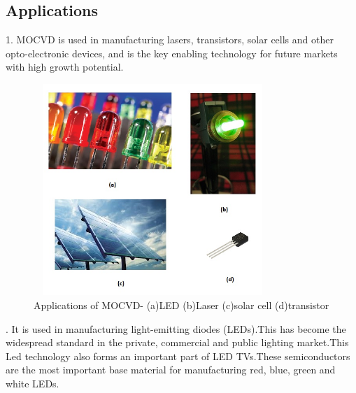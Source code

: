 \begin{flushleft}
\section{Applications}
1. \hspace{2mm}MOCVD is used in manufacturing lasers, transistors, solar cells and other\\    \hspace{7mm}opto-electronic devices, and is the key enabling technology for future markets\\  \hspace{7mm}with high growth potential.
\vspace{5mm}
\newline
\begin{figure}[h!] 
	\centering
	\includegraphics[width=9cm, height=8cm]{images/trans.png} 
	\caption{Applications of MOCVD-  (a)LED  (b)Laser (c)solar cell (d)transistor }
	\label{fig:img8} 
\end{figure}
\vspace{5mm}
. \hspace{2mm}It is used in manufacturing light-emitting diodes (LEDs).This has become the\\ \hspace{7mm}widespread standard in the private, commercial and public lighting market.This\\ \hspace{7mm}Led technology also forms an important part of LED TVs.These semiconductors\\
\hspace{7mm}are the most important base material for manufacturing red, blue, green and\\ \hspace{7mm}white LEDs.

\end{flushleft}
